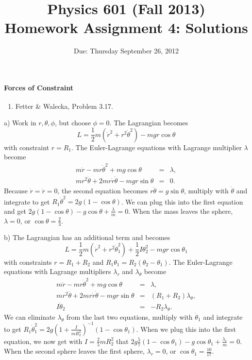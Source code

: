 \documentclass[letterpaper,11pt]{article}
\title{Physics 601 (Fall 2013) \\ Homework Assignment 4: Solutions}
\date{Due: Thursday September 26, 2012}
\begin{document}
\maketitle

\paragraph*{Forces of Constraint}
\begin{enumerate}
 \item Fetter \& Walecka, Problem 3.17.
\end{enumerate}

a) Work in $r,\theta,\phi$, but choose $\phi = 0$.  The Lagrangian becomes
\begin{equation*}
 L = \frac{1}{2}m(\dot{r}^2+r^2\dot{\theta}^2) - m g r \cos\theta
\end{equation*}
with constraint $r = R_1$.  The Euler-Lagrange equations with Lagrange multiplier $\lambda$ become
\begin{eqnarray*}
 m\ddot{r} - m r \dot{\theta}^2 + m g \cos\theta & = & \lambda, \\
 m r^2 \ddot\theta + 2 m r \dot{r} \dot\theta - m g r \sin\theta & = & 0.
\end{eqnarray*}
Because $\dot{r} = \ddot{r} = 0$, the second equation becomes $r \ddot\theta = g \sin\theta$, multiply with $\dot\theta$ and integrate to get $R_1 \dot\theta^2 = 2 g (1 - \cos\theta)$.  We can plug this into the first equation and get $2 g (1 - \cos\theta) - g \cos\theta + \frac{\lambda}{m} = 0$.  When the mass leaves the sphere, $\lambda = 0$, or $\cos\theta = \frac{2}{3}$.

b) The Lagrangian has an additional term and becomes
\begin{equation*}
 L = \frac{1}{2}m(\dot{r}^2+r^2\dot\theta_1^2) + \frac{1}{2} I \theta_2^2 - m g r \cos\theta_1
\end{equation*}
with constraints $r = R_1 + R_2$ and $R_1 \theta_1 = R_2 (\theta_2 - \theta_1)$.  The Euler-Lagrange equations with Lagrange multipliers $\lambda_r$ and $\lambda_\theta$ become
\begin{eqnarray*}
 m\ddot{r} - m r \dot{\theta}^2 + m g \cos\theta & = & \lambda, \\
 m r^2 \ddot\theta + 2 m r \dot{r} \dot\theta - m g r \sin\theta & = & (R_1 + R_2) \lambda_\theta, \\
 I \ddot\theta_2 & = & -R_2 \lambda_\theta.
\end{eqnarray*}
We can eliminate $\lambda_\theta$ from the last two equations, multiply with $\dot\theta_1$ and integrate to get $R_1 \dot\theta_1^2 = 2 g (1 + \frac{I}{m R_2^2})^{-1} (1 - \cos\theta_1)$.  When we plug this into the first equation, we now get with $I = \frac{2}{5} m R_2^2$ that $2 g \frac{5}{7} (1 - \cos\theta_1) - g \cos\theta_1 + \frac{\lambda_r}{m} = 0$.  When the second sphere leaves the first sphere, $\lambda_r = 0$, or $\cos\theta_1 = \frac{10}{17}$.
\end{document}
